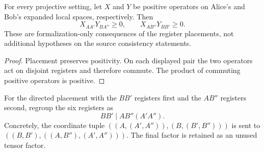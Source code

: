 \begin{theorem}
	\label{thm:qld-specialized-placement-positivity}
	\leanok
	For every projective setting, let $X$ and $Y$ be positive operators on
	Alice's and Bob's expanded local spaces, respectively. Then
	\[
		X_{AA'}Y_{BA''}\geq 0,
		\qquad X_{AB''}Y_{BB'}\geq 0.
	\]
	These are formalization-only consequences of the register placements,
	not additional hypotheses on the source consistency statements.
\end{theorem}
\begin{proof}
	\leanok
	Placement preserves positivity. On each displayed pair the two operators
	act on disjoint registers and therefore commute. The product of commuting
	positive operators is positive.
\end{proof}

\begin{definition}
	\label{def:qld-opposite-bipartition}
	\leanok
	For the directed placement with the $BB'$ registers first and the $AB''$
	registers second, regroup the six registers as
	\[
		BB'\mid AB''(A'A'').
	\]
	Concretely, the coordinate tuple
	$((A,(A',A'')),(B,(B',B'')))$ is sent to
	$((B,B'),((A,B''),(A',A'')))$. The final factor is retained as an unused
	tensor factor.
\end{definition}

